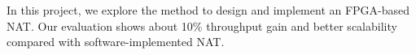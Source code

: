 
In this project, we explore the method to design and implement an FPGA-based NAT. Our evaluation shows about 10\% throughput gain and better scalability compared with software-implemented NAT.